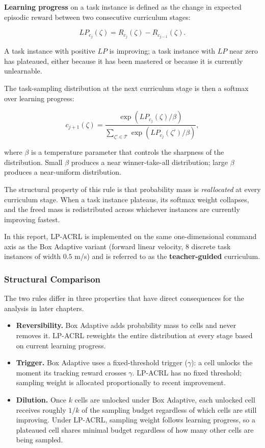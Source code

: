 \textbf{Learning progress} on a task instance is defined as the change in expected episodic reward between two consecutive curriculum stages:

\[
LP_{c_j}(\zeta) = R_{c_j}(\zeta) - R_{c_{j-1}}(\zeta). \tag{6}
\]

A task instance with positive $LP$ is improving; a task instance with $LP$ near zero has plateaued, either because it has been mastered or because it is currently unlearnable.

The task-sampling distribution at the next curriculum stage is then a softmax over learning progress:

\[
c_{j+1}(\zeta) = \frac{\exp\!\left( LP_{c_j}(\zeta) / \beta \right)}{\sum_{\zeta' \in \mathcal{T}} \exp\!\left( LP_{c_j}(\zeta') / \beta \right)}, \tag{7}
\]

where $\beta$ is a temperature parameter that controls the sharpness of the distribution. Small $\beta$ produces a near winner-take-all distribution; large $\beta$ produces a near-uniform distribution.

The structural property of this rule is that probability mass is \textit{reallocated} at every curriculum stage. When a task instance plateaus, its softmax weight collapses, and the freed mass is redistributed across whichever instances are currently improving fastest.

In this report, LP-ACRL is implemented on the same one-dimensional command axis as the Box Adaptive variant (forward linear velocity, 8 discrete task instances of width $0.5$ m/s) and is referred to as the \textbf{teacher-guided} curriculum.

\subsubsection{Structural Comparison}

The two rules differ in three properties that have direct consequences for the analysis in later chapters.

\begin{itemize}
  \item \textbf{Reversibility.} Box Adaptive adds probability mass to cells and never removes it. LP-ACRL reweights the entire distribution at every stage based on current learning progress.
  \item \textbf{Trigger.} Box Adaptive uses a fixed-threshold trigger ($\gamma$): a cell unlocks the moment its tracking reward crosses $\gamma$. LP-ACRL has no fixed threshold; sampling weight is allocated proportionally to recent improvement.
  \item \textbf{Dilution.} Once $k$ cells are unlocked under Box Adaptive, each unlocked cell receives roughly $1/k$ of the sampling budget regardless of which cells are still improving. Under LP-ACRL, sampling weight follows learning progress, so a plateaued cell shares minimal budget regardless of how many other cells are being sampled.
\end{itemize}

